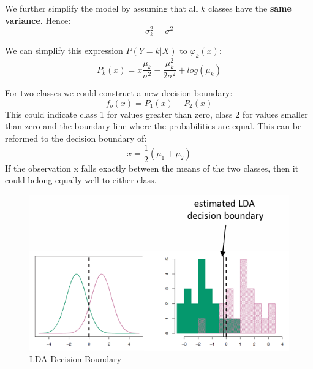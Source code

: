 \documentclass[../Main.tex]{subfiles}
\begin{document}
We further simplify the model by 
assuming that all \(k\) classes have the 
\textbf{same variance}. Hence:
\begin{equation*}
    \sigma_k^2 = \sigma^2
\end{equation*}

We can simplify this expression \(P(Y=k|X)\) to \(\varphi_k(x)\):
\begin{equation}
    P_k(x) = x \frac{\mu_k}{\sigma^2} - \frac{\mu_k^2}{2\sigma^2} + log(\mu_k)
\end{equation}

For two classes we could construct a new decision boundary:
\begin{equation*}
    f_b(x) = P_1(x)-P_2(x)
\end{equation*}
This could indicate class 1 for values greater than zero, class 2 for values smaller than zero and
the boundary line where the probabilities are equal.
This can be reformed to the decision boundary of:
\begin{equation*}
    x = \frac{1}{2} (\mu_1+\mu_2)
\end{equation*}
If the observation x falls exactly between the 
means of the two classes, then it could 
belong equally well to either class.

\begin{figure}[H]
    \centering
    \includegraphics[width=0.75\linewidth]{Images/lda-decision-boundary.png}
    \caption{LDA Decision Boundary}
\end{figure}

\end{document}
